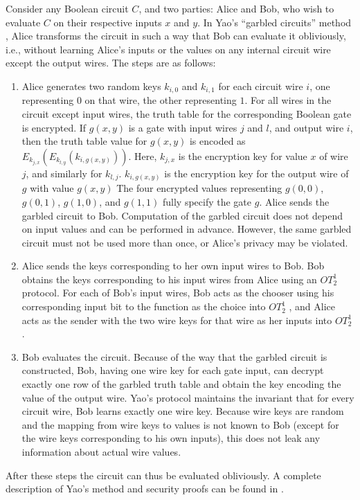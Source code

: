 Consider any Boolean circuit $C$, and two parties: Alice and Bob,
who wish to evaluate $C$ on their respective inputs $x$ and $y$.
In Yao's {}``garbled circuits'' method \cite{Yao86}, Alice transforms
the circuit in such a way that Bob can evaluate it obliviously, i.e.,
without learning Alice's inputs or the values on any internal circuit
wire except the output wires. The steps are as follows:
\begin{enumerate}
\item Alice generates two random keys $k_{i,0}$ and $k_{i,1}$ for each
circuit wire $i$, one representing $0$ on that wire, the other representing
$1$. For all wires in the circuit except input wires, the truth table
for the corresponding Boolean gate is encrypted. If $g(x,y)$ is a
gate with input wires $j$ and $l$, and output wire $i$, then the
truth table value for $g(x,y)$ is encoded as $E_{k_{j,x}}\left(E_{k_{l,y}}\left(k_{i,g(x,y)}\right)\right)$.
Here, $k_{j,x}$ is the encryption key for value $x$ of wire $j$,
and similarly for $k_{l,j}$. $k_{i,g(x,y)}$ is the encryption key
for the output wire of $g$ with value $g(x,y)$ The four encrypted
values representing $g(0,0)$, $g(0,1)$, $g(1,0)$, and $g(1,1)$
fully specify the gate $g$. Alice sends the garbled circuit to Bob.
Computation of the garbled circuit does not depend on input values
and can be performed in advance. However, the same garbled circuit
must not be used more than once, or Alice's privacy may be violated.
\item Alice sends the keys corresponding to her own input wires to Bob.
Bob obtains the keys corresponding to his input wires from Alice using
an $OT_{2}^{1}$ protocol. For each of Bob's input wires, Bob acts
as the chooser using his corresponding input bit to the function as the choice 
into $OT_{2}^{1}$ , and Alice acts as the sender with the two wire keys for that wire
as her inputs into $OT_{2}^{1}$ .
\item Bob evaluates the circuit. Because of the way that the garbled circuit
is constructed, Bob, having one wire key for each gate input, can
decrypt exactly one row of the garbled truth table and obtain the
key encoding the value of the output wire. Yao's protocol maintains
the invariant that for every circuit wire, Bob learns exactly one
wire key. Because wire keys are random and the mapping from wire keys
to values is not known to Bob (except for the wire keys corresponding
to his own inputs), this does not leak any information about actual
wire values. 
\end{enumerate}
After these steps the circuit can thus be evaluated obliviously. A complete
description of Yao's method and security proofs can be found in \cite{Goldreich:vol2}.

